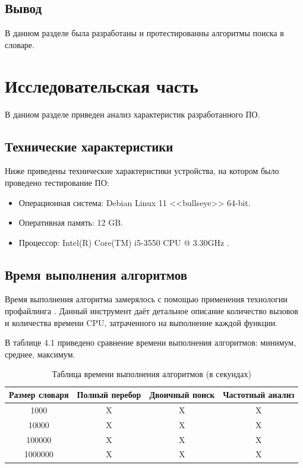 \documentclass[12pt]{report}
\begin{document}
\section*{Вывод}
	
В данном разделе была разработаны и протестированны алгоритмы поиска в словаре.
	
\chapter{Исследовательская часть}
	
В данном разделе приведен анализ характеристик разработанного ПО.

\section{Технические характеристики}
	
Ниже приведены технические характеристики устройства, на котором было проведено тестирование ПО:
	
\begin{itemize}
	\item Операционная система: Debian \cite{debian} Linux \cite{linux} 11 <<bullseye>> 64-bit.
	\item Оперативная память: 12 GB.
	\item Процессор: Intel(R) Core(TM) i5-3550 CPU @ 3.30GHz \cite{i5}.	
\end{itemize}
	
\section{Время выполнения алгоритмов}
	
Время выполнения алгоритма замерялось с помощью применения технологии профайлинга \cite{profiling}. Данный инструмент даёт детальное описание количество вызовов и количества времени CPU, затраченного на выполнение каждой функции.

В таблице 4.1 приведено сравнение времени выполнения алгоритмов: минимум, среднее, максимум.

\begin{table} [H]
		\caption{Таблица времени выполнения алгоритмов (в секундах)}
		\begin{center}
			\begin{tabular}{|c c c c |} 
				\hline
				Размер словаря & Полный перебор & Двоичный поиск & Частотный анализ  \\  
				\hline
				1000 & X & X & X  \\
				\hline
				10000 & X & X & X \\
				\hline
				100000 & X & X & X \\
				\hline
				1000000 & X & X & X  \\
				\hline
			\end{tabular}
		\end{center}
\end{table}
	
\end{document}
